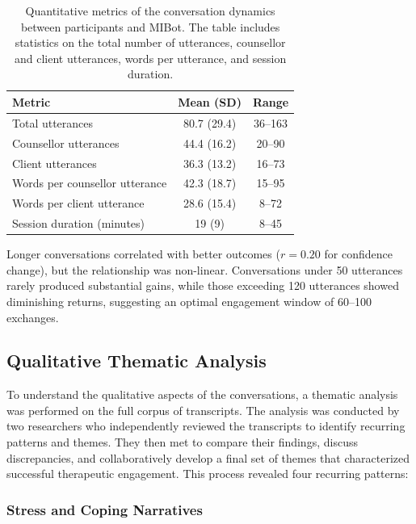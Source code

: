 \begin{table}[ht]
  \centering
  \small
  \setlength{\tabcolsep}{4pt}
  \renewcommand{\arraystretch}{1.1}
  \begin{tabular}{@{}lcc@{}}
    \toprule
    \textbf{Metric} & \textbf{Mean (SD)} & \textbf{Range} \\
    \midrule
    Total utterances & 80.7 (29.4) & 36--163 \\
    Counsellor utterances & 44.4 (16.2) & 20--90 \\
    Client utterances & 36.3 (13.2) & 16--73 \\
    Words per counsellor utterance & 42.3 (18.7) & 15--95 \\
    Words per client utterance & 28.6 (15.4) & 8--72 \\
    Session duration (minutes) & 19 (9) & 8--45 \\
    \bottomrule
  \end{tabular}
  \caption[Quantitative Conversation Metrics]{Quantitative metrics of the conversation dynamics between participants and MIBot. The table includes statistics on the total number of utterances, counsellor and client utterances, words per utterance, and session duration.}
  \label{table:conversation_metrics}
\end{table}

Longer conversations correlated with better outcomes ($r=0.20$ for confidence change), but the relationship was non-linear. Conversations under 50 utterances rarely produced substantial gains, while those exceeding 120 utterances showed diminishing returns, suggesting an optimal engagement window of 60--100 exchanges.

\subsection{Qualitative Thematic Analysis}

To understand the qualitative aspects of the conversations, a thematic analysis was performed on the full corpus of transcripts. The analysis was conducted by two researchers who independently reviewed the transcripts to identify recurring patterns and themes. They then met to compare their findings, discuss discrepancies, and collaboratively develop a final set of themes that characterized successful therapeutic engagement. This process revealed four recurring patterns:

\subsubsection{Stress and Coping Narratives}

